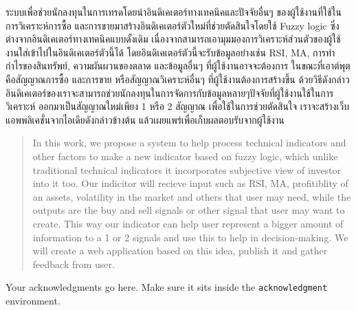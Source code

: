 \maketitle
\makesignature

\ifproject
\begin{abstractTH}
ระบบเพื่อช่วยนักลงทุนในการเทรดโดยนำอินดิเคเตอร์ทางเทคนิคและปัจจัยอื่นๆ ของผู้ใช้งานที่ใช้ในการวิเคราะห์การซื้อ และการขายมาสร้างอินดิเคเตอร์ตัวใหม่ที่ช่วยตัดสินใจโดยใช้ Fuzzy logic 
ซึ่งต่างจากอินดิเคเตอร์ทางเทคนิคแบบดั้งเดิม เนื่องจากสามารถเอามุมมองการวิเคราะห์ส่วนตัวของผู้ใช้งานใส่เข้าไปในอินดิเคเตอร์ตัวนี้ได้ โดยอินดิเคเตอร์ตัวนี้จะรับข้อมูลอย่างเช่น RSI, 
MA, การทำกำไรของสินทรัพย์, ความผันผวนของตลาด และข้อมูลอื่นๆ ที่ผู้ใช้งานอาจจะต้องการ ในขณะที่เอาต์พุตคือสัญญาณการซื้อ และการขาย หรือสัญญาณวิเคราะห์อื่นๆ 
ที่ผู้ใช้งานต้องการสร้างขึ้น ด้วยวิธีดังกล่าวอินดิเคเตอร์ของเราจะสามารถช่วยนักลงทุนในการจัดการกับข้อมูลหลายๆปัจจัยที่ผู้ใช้งานใช้ในการวิเคราะห์ ออกมาเป็นสัญญาณใหม่เพียง 1 หรือ 2 
สัญญาณ เพื่อใช้ในการช่วยตัดสินใจ เราจะสร้างเว็บแอพพลิเคชั่นจากไอเดียดังกล่าวข้างต้น แล้วเผยแพร่เพื่อเก็บผลตอบรับจากผู้ใช้งาน
\end{abstractTH}

\begin{abstract}
In this work, we propose a system to help process technical indicators and other factors to make a new indicator based on 
fuzzy logic, which unlike traditional technical indicators it incorporates subjective view of investor into it too. 
Our indicitor will recieve input such as RSI, MA, profitiblity of an assets, volatility in the market and others that user may 
need, while the outputs are the buy and sell signals or other signal that user may want to create. This way our indicator can help 
user represent a bigger amount of information to a 1 or 2 signals and use this to help in decision-making. 
We will create a web application based on this idea, publish it and gather feedback from user.
\end{abstract}

\iffalse
\begin{dedication}
This document is dedicated to all Chiang Mai University students.

Dedication page is optional.
\end{dedication}
\fi %

\begin{acknowledgments}
Your acknowledgments go here. Make sure it sits inside the
\texttt{acknowledgment} environment.

\end{acknowledgments}%
\fi %

\contentspage

\ifproject
\figurelistpage

\tablelistpage
\fi %



